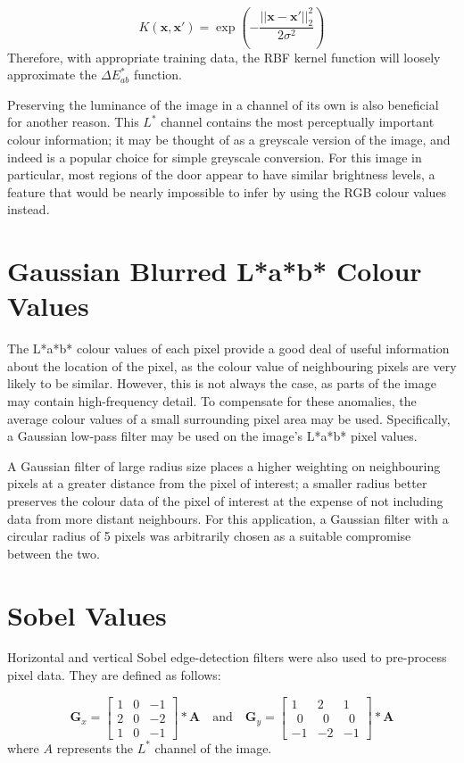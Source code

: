 \begin{equation}
K(\mathbf{x}, \mathbf{x'}) = \exp\left(-\frac{||\mathbf{x} - \mathbf{x'}||_2^2}{2\sigma^2}\right)
\end{equation}
Therefore, with appropriate training data, the RBF kernel function will loosely approximate the $\Delta E_{ab}^*$ function.

  Preserving the luminance of the image in a channel of its own is also beneficial for another reason. This $L^*$ channel contains the most perceptually important colour information; it may be thought of as a greyscale version of the image, and indeed is a popular choice for simple greyscale conversion. For this image in particular, most regions of the door appear to have similar brightness levels, a feature that would be nearly impossible to infer by using the RGB colour values instead.

\section{Gaussian Blurred L*a*b* Colour Values}
The L*a*b* colour values of each pixel provide a good deal of useful information about the location of the pixel, as the colour value of neighbouring pixels are very likely to be similar.  However, this is not always the case, as parts of the image may contain high-frequency detail.  To compensate for these anomalies, the average colour values of a small surrounding pixel area may be used. Specifically, a Gaussian low-pass filter may be used on the image's L*a*b* pixel values.  

A Gaussian filter of large radius size places a higher weighting on neighbouring pixels at a greater distance from the pixel of interest; a smaller radius better preserves the colour data of the pixel of interest at the expense of not including data from more distant neighbours.  For this application, a Gaussian filter with a circular radius of 5 pixels was arbitrarily chosen as a suitable compromise between the two. 

\section{Sobel Values}
Horizontal and vertical Sobel edge-detection filters were also used to pre-process pixel data. They are defined as follows:

$$ \mathbf{G}_x = 
\begin{bmatrix} 1 & 0 & -1 \\
2 & 0 & -2 \\
1 & 0 & -1 
\end{bmatrix} * \mathbf{A}
\quad
\mbox{and}
\quad   
\mathbf{G}_y = \begin{bmatrix} 
1 & 2 & 1  \\
\ \ 0 & \ \ 0 & \ \ 0 \\
-1 & -2 & -1 
\end{bmatrix} * \mathbf{A}
$$
where $A$ represents the $L^*$ channel of the image.


